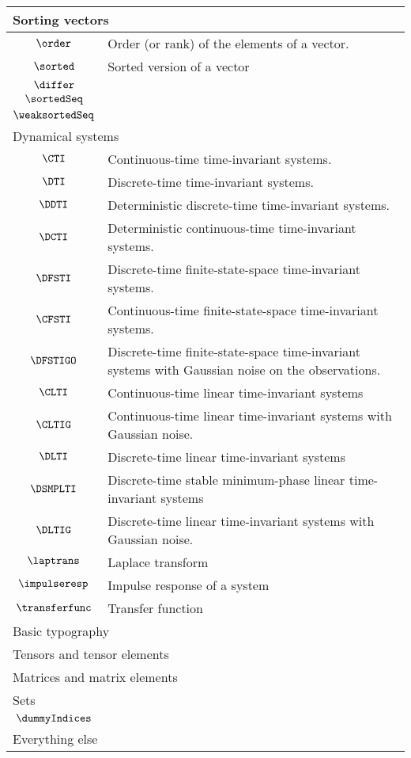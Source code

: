 \begin{longtable}{cl}
 \multicolumn{2}{l}{Sorting vectors}\\ 
 \hline
$\order$ &  Order (or rank) of the elements of a vector.\\ 
 $\sorted$ &  Sorted version of a vector\\ 
 $\differ$ & \\ 
 $\sortedSeq$ & \\ 
 $\weaksortedSeq$ & \\ 
 \multicolumn{2}{l}{Dynamical systems}\\ 
 \hline
$\CTI$ &  Continuous-time time-invariant systems.\\ 
 $\DTI$ &  Discrete-time time-invariant systems.\\ 
 $\DDTI$ &  Deterministic discrete-time time-invariant systems.\\ 
 $\DCTI$ &  Deterministic continuous-time time-invariant systems.\\ 
 $\DFSTI$ &  Discrete-time finite-state-space time-invariant systems.\\ 
 $\CFSTI$ &  Continuous-time finite-state-space time-invariant systems.\\ 
 $\DFSTIGO$ &  Discrete-time finite-state-space time-invariant systems with Gaussian noise on the observations.\\ 
 $\CLTI$ &  Continuous-time linear time-invariant systems\\ 
 $\CLTIG$ &  Continuous-time linear time-invariant systems with Gaussian noise.\\ 
 $\DLTI$ &  Discrete-time linear time-invariant systems\\ 
 $\DSMPLTI$ &  Discrete-time stable minimum-phase linear time-invariant systems\\ 
 $\DLTIG$ &  Discrete-time linear time-invariant systems with Gaussian noise.\\ 
 $\laptrans$ &  Laplace transform\\ 
 $\impulseresp$ &  Impulse response of a system\\ 
 $\transferfunc$ &  Transfer function\\ 
 \multicolumn{2}{l}{Basic typography}\\ 
 \hline
\hline
\multicolumn{2}{l}{Tensors and tensor elements}\\ 
 \hline
\multicolumn{2}{l}{Matrices and matrix elements}\\ 
 \hline
\multicolumn{2}{l}{Sets}\\ 
 \hline
$\dummyIndices$ & \\ 
 \multicolumn{2}{l}{Everything else}\\ 
 \hline
\end{longtable}

